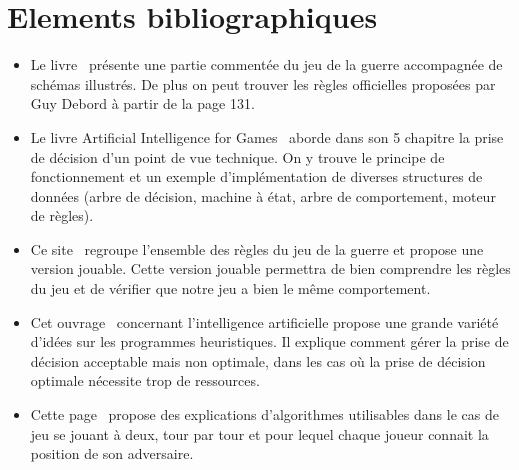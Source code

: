 \chapter{Elements bibliographiques}

	\begin{itemize}

		\item Le livre~\cite{ref1} présente une partie commentée du jeu de la guerre accompagnée de schémas illustrés. 
		De plus on peut trouver les règles officielles proposées par Guy Debord à partir de la page 131.
		\\[0.7\baselineskip]

		\item Le livre Artificial Intelligence for Games~\cite{ref2} aborde dans son 5 chapitre la prise de décision d'un point de vue technique. 
		On y trouve le principe de fonctionnement et un exemple d'implémentation de diverses structures de données (arbre de décision, machine à état, 
		arbre de comportement, moteur de règles).
		\\[0.7\baselineskip]

		\item Ce site~\cite{ref3} regroupe l'ensemble des règles du jeu de la guerre et propose une version jouable. Cette version jouable permettra 
		de bien comprendre les règles du jeu et de vérifier que notre jeu a bien le même comportement.
		\\[0.7\baselineskip]

		\item Cet ouvrage~\cite{ref4} concernant l'intelligence artificielle propose une grande variété d'idées sur les programmes heuristiques. 
		Il explique comment gérer la prise de décision acceptable mais non optimale, dans les cas où la prise de décision optimale nécessite trop de ressources.
		\\[0.7\baselineskip]

		\item Cette page~\cite{ref5} propose des explications d'algorithmes utilisables dans le cas de jeu se jouant à deux, tour par tour et 
		pour lequel chaque joueur connait la position de son adversaire.
		\\[0.7\baselineskip]


\end{itemize}
